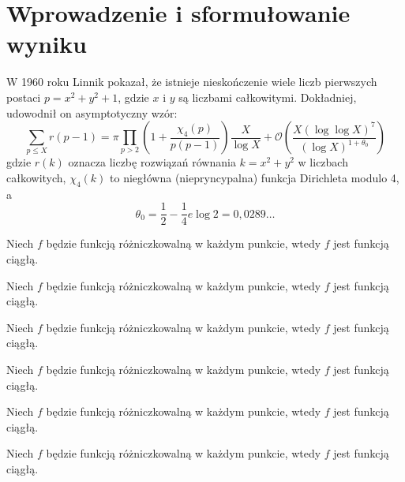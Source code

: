 
\section{Wprowadzenie i sformułowanie wyniku}
W 1960 roku Linnik pokazał, że istnieje nieskończenie wiele liczb pierwszych postaci $p = x^2 + y^2 + 1$,  
gdzie $x$ i $y$ są liczbami całkowitymi.  
Dokładniej, udowodnił on asymptotyczny wzór:
%
\begin{equation*}
  \sum_{p \leq X}{r(p - 1)}
    =
  \pi \prod_{p > 2}
  \left(
    1 + \frac{\chi_4(p)}{p(p - 1)}
  \right)
  \frac{X}{\log X}
    +
  \mathcal{O}
  \left(
    \frac{X (\log \log X)^7}{(\log X)^{1 + \theta_0}}
  \right)
\end{equation*}
%
gdzie $r(k)$ oznacza liczbę rozwiązań równania $k = x^2 + y^2$ w liczbach całkowitych,  
$\chi_4(k)$ to niegłówna (niepryncypalna) funkcja Dirichleta modulo 4, a
%
\begin{equation}
  \theta_0 = \frac{1}{2} - \frac{1}{4} e \log 2 = 0{,}0289 \dots
\end{equation}

\begin{theorem}
  Niech $f$ będzie funkcją różniczkowalną w każdym punkcie,  
  wtedy $f$ jest funkcją ciągłą.
\end{theorem}

\begin{definition}
  Niech $f$ będzie funkcją różniczkowalną w każdym punkcie,  
  wtedy $f$ jest funkcją ciągłą.
\end{definition}

\begin{lemma}
  Niech $f$ będzie funkcją różniczkowalną w każdym punkcie,  
  wtedy $f$ jest funkcją ciągłą.
\end{lemma}

\begin{proposition}
  Niech $f$ będzie funkcją różniczkowalną w każdym punkcie,  
  wtedy $f$ jest funkcją ciągłą.
\end{proposition}

\begin{corollary}
  Niech $f$ będzie funkcją różniczkowalną w każdym punkcie,  
  wtedy $f$ jest funkcją ciągłą.
\end{corollary}

\begin{remark}
  Niech $f$ będzie funkcją różniczkowalną w każdym punkcie,  
  wtedy $f$ jest funkcją ciągłą.
\end{remark}

